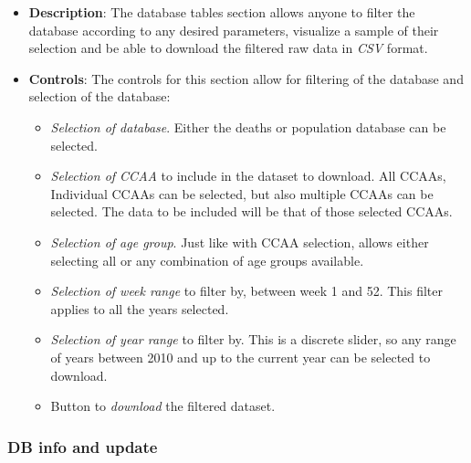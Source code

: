 \documentclass[
  a4paper]{article}
\providecommand{\tightlist}{%
  \setlength{\itemsep}{0pt}\setlength{\parskip}{0pt}}
\begin{document}
\begin{itemize}
\item
  \textbf{Description}: The database tables section allows anyone to
  filter the database according to any desired parameters, visualize a
  sample of their selection and be able to download the filtered raw
  data in \emph{CSV} format.
\item
  \textbf{Controls}: The controls for this section allow for filtering
  of the database and selection of the database:

  \begin{itemize}
  \tightlist
  \item
    \emph{Selection of database}. Either the deaths or population
    database can be selected.
  \item
    \emph{Selection of CCAA} to include in the dataset to download. All
    CCAAs, Individual CCAAs can be selected, but also multiple CCAAs can
    be selected. The data to be included will be that of those selected
    CCAAs.
  \item
    \emph{Selection of age group}. Just like with CCAA selection, allows
    either selecting all or any combination of age groups available.
  \item
    \emph{Selection of week range} to filter by, between week 1 and 52.
    This filter applies to all the years selected.
  \item
    \emph{Selection of year range} to filter by. This is a discrete
    slider, so any range of years between 2010 and up to the current
    year can be selected to download.
  \item
    Button to \emph{download} the filtered dataset.
  \end{itemize}
\end{itemize}

\hypertarget{DBInfoLayout}{%
\subsubsection{DB info and update}\label{DBInfoLayout}}
\end{document}
